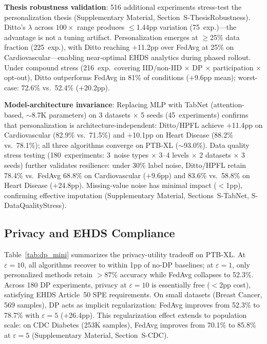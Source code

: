 \documentclass[conference]{IEEEtran}
\begin{document}
\textbf{Thesis robustness validation}: 516 additional experiments stress-test the personalization thesis (Supplementary Material, Section~S-ThesisRobustness). Ditto's $\lambda$ across $100\times$ range produces $\leq$1.44pp variation (75~exp.)---the advantage is not a tuning artifact. Personalization emerges at $\geq$25\% data fraction (225~exp.), with Ditto reaching $+$11.2pp over FedAvg at 25\% on Cardiovascular---enabling near-optimal EHDS analytics during phased rollout. Under compound stress (216~exp.\ covering IID/non-IID $\times$ DP $\times$ participation $\times$ opt-out), Ditto outperforms FedAvg in 81\% of conditions ($+$9.6pp mean); worst-case: 72.6\% vs.\ 52.4\% ($+$20.2pp).

\textbf{Model-architecture invariance}: Replacing MLP with TabNet (attention-based, $\sim$8.7K parameters) on 3 datasets $\times$ 5 seeds (45~experiments) confirms that personalization is architecture-independent: Ditto/HPFL achieve $+$11.4pp on Cardiovascular (82.9\% vs.\ 71.5\%) and $+$10.1pp on Heart Disease (88.2\% vs.\ 78.1\%); all three algorithms converge on PTB-XL ($\sim$93.0\%). Data quality stress testing (180~experiments: 3~noise types $\times$ 3--4 levels $\times$ 2 datasets $\times$ 3 seeds) further validates resilience: under 30\% label noise, Ditto/HPFL retain 78.4\% vs.\ FedAvg 68.8\% on Cardiovascular ($+$9.6pp) and 83.6\% vs.\ 58.8\% on Heart Disease ($+$24.8pp). Missing-value noise has minimal impact ($<$1pp), confirming effective imputation (Supplementary Material, Sections~S-TabNet, S-DataQualityStress).

\subsection{Privacy and EHDS Compliance}

Table~\ref{tab:dp_mini} summarizes the privacy-utility tradeoff on PTB-XL. At $\varepsilon{=}10$, all algorithms recover to within 1pp of no-DP baselines; at $\varepsilon{=}1$, only personalized methods retain $>$87\% accuracy while FedAvg collapses to 52.3\%. Across 180 DP experiments, privacy at $\varepsilon{=}10$ is essentially free ($<$2pp cost), satisfying EHDS Article~50 SPE requirements. On small datasets (Breast Cancer, 569 samples), DP acts as implicit regularization: FedAvg improves from 52.3\% to 78.7\% with $\varepsilon{=}5$ ($+$26.4pp). This regularization effect extends to population scale: on CDC Diabetes (253K samples), FedAvg improves from 70.1\% to 85.8\% at $\varepsilon{=}5$ (Supplementary Material, Section~S-CDC).
\end{document}
